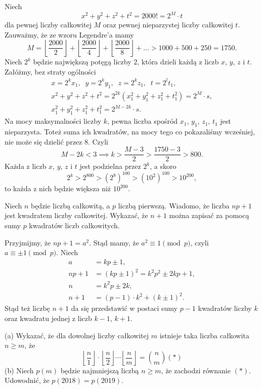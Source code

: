 \vspace{10px}
\noindent
Niech
\[
	x^2 + y^2 + z^2 + t^2 = 2000! = 2^M \cdot t
\]
dla pewnej liczby całkowitej $M$ oraz pewnej nieparzystej liczby całkowitej $t$. Zauważmy, że ze wzoru Legendre'a mamy
\[
	M = \left\lfloor \frac{2000}{2} \right\rfloor + \left\lfloor \frac{2000}{4} \right\rfloor + \left\lfloor \frac{2000}{8} \right\rfloor + ... > 1000 + 500 + 250 = 1750.
\]
Niech $2^k$ będzie największą potęgą liczby $2$, która dzieli każdą z liczb $x$, $y$, $z$ i $t$. Załóżmy, bez straty ogólności
\begin{gather*}
	x = 2^{k}x_1, \;\; y = 2^{k}y_1, \;\; z = 2^{k}z_1, \;\; t = 2^{l}t_1, \\
	x^2 + y^2 + z^2 + t^2 = 2^{2k} \left(x_1^2 + y_1^2 + z_1^2 + t_1^2\right) = 2^M \cdot s, \\
	x_1^2 + y_1^2 + z_1^2 + t_1^2 = 2^{M - 2k} \cdot s.
\end{gather*}
Na mocy maksymalności liczby $k$, pewna liczba spośród $x_1$, $y_1$, $z_1$, $t_1$ jest nieparzysta. Toteż suma ich kwadratów, na mocy tego co pokazaliśmy wcześniej, nie może się dzielić przez $8$. Czyli
\[
 M - 2k < 3 \implies k > \frac{M - 3}{2} > \frac{1750 - 3}{2} > 800.
\]
Każda z liczb $x$, $y$, $z$ i $t$ jest podzielna przez $2^{k}$, a skoro
\[
	2^k > 2^{800} > \left(2^{8}\right)^{100} > \left(10^{2}\right)^{100} > 10^{200},
\]
to każda z nich będzie większa niż $10^{200}$.
\vspace{5px}

\begin{problem}{5}
	Niech $n$ będzie liczbą całkowitą, a $p$ liczbą pierwszą. Wiadomo, że liczba $np + 1$ jest kwadratem liczby całkowitej. Wykazać, że $n + 1$ można zapisać za pomocą sumy $p$ kwadratów liczb całkowitych.
\end{problem}

\noindent
Przyjmijmy, że $np + 1 = a^2$. Stąd mamy, że $a^2 \equiv 1 \pmod{p}$, czyli $a \equiv \pm 1 \pmod{p}$. Niech
\begin{align*}
	a &= kp \pm 1, \\
	np + 1 &= (kp \pm 1)^2 = k^2p^2 \pm 2kp + 1, \\
	n &= k^2p \pm 2k, \\
	n + 1 &= (p - 1) \cdot k^2 + (k \pm 1)^2.
\end{align*}
Stąd też liczbę $n + 1$ da się przedstawić w postaci sumy $p - 1$ kwadratów liczby $k$ oraz kwadratu jednej z liczb $k - 1$, $k + 1$.
\vspace{5px}

\begin{problem}{6}
	(a) Wykazać, że dla dowolnej liczby całkowitej $m$ istnieje taka liczba całkowita $n \geqslant m$, że
\[
	\left \lfloor \frac{n}{1} \right \rfloor \cdot \left \lfloor \frac{n}{2} \right \rfloor \cdots \left \lfloor \frac{n}{m} \right \rfloor = \binom{n}{m}         (*)
\]
(b) Niech $p(m)$ będzie najmniejszą liczbą $n \geqslant m$, że zachodzi równanie  $(*)$. Udowodnić, że $p(2018) = p(2019).$
\end{problem}


